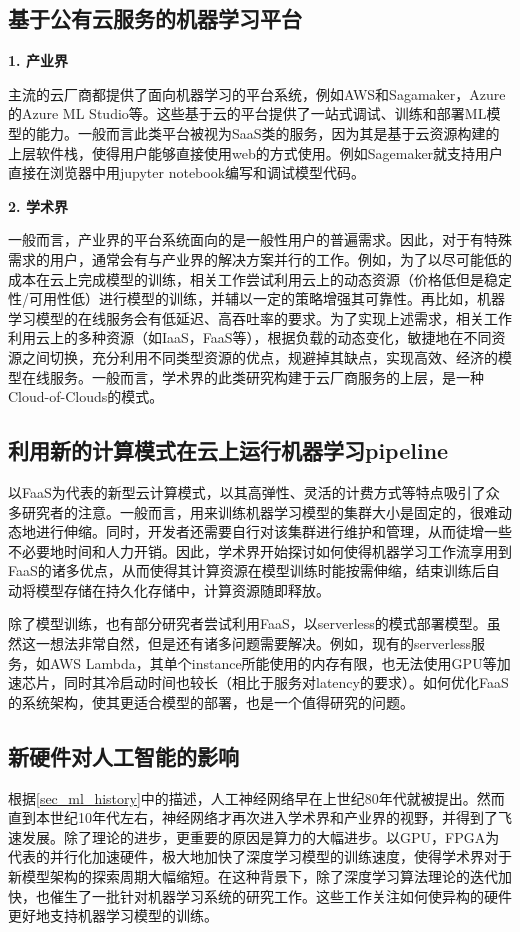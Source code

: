 \subsection{基于公有云服务的机器学习平台}
\textbf{1. 产业界}

主流的云厂商都提供了面向机器学习的平台系统，例如AWS和Sagamaker\parencite{joshi2020amazon,liberty2020elastic,perrone2020amazon}，Azure的Azure ML Studio\parencite{etaati2019azure}等。这些基于云的平台提供了一站式调试、训练和部署ML模型的能力。一般而言此类平台被视为SaaS类的服务，因为其是基于云资源构建的上层软件栈，使得用户能够直接使用web的方式使用。例如Sagemaker就支持用户直接在浏览器中用jupyter notebook编写和调试模型代码。

\textbf{2. 学术界}

一般而言，产业界的平台系统面向的是一般性用户的普遍需求。因此，对于有特殊需求的用户，通常会有与产业界的解决方案并行的工作。例如，为了以尽可能低的成本在云上完成模型的训练，相关工作\parencite{harlap2017proteus,li2020spottune}尝试利用云上的动态资源（价格低但是稳定性/可用性低）进行模型的训练，并辅以一定的策略增强其可靠性。再比如，机器学习模型的在线服务会有低延迟、高吞吐率的要求。为了实现上述需求，相关工作\parencite{zhang2019mark}利用云上的多种资源（如IaaS，FaaS等），根据负载的动态变化，敏捷地在不同资源之间切换，充分利用不同类型资源的优点，规避掉其缺点，实现高效、经济的模型在线服务。一般而言，学术界的此类研究构建于云厂商服务的上层，是一种Cloud-of-Clouds的模式。

\subsection{利用新的计算模式在云上运行机器学习pipeline}
以FaaS为代表的新型云计算模式，以其高弹性、灵活的计费方式等特点吸引了众多研究者的注意。一般而言，用来训练机器学习模型的集群大小是固定的，很难动态地进行伸缩。同时，开发者还需要自行对该集群进行维护和管理，从而徒增一些不必要地时间和人力开销。因此，学术界开始探讨如何使得机器学习工作流享用到FaaS的诸多优点\parencite{wang2019distributed}，从而使得其计算资源在模型训练时能按需伸缩，结束训练后自动将模型存储在持久化存储中，计算资源随即释放。

除了模型训练，也有部分研究者尝试利用FaaS，以serverless的模式部署模型。虽然这一想法非常自然，但是还有诸多问题需要解决。例如，现有的serverless服务，如AWS Lambda，其单个instance所能使用的内存有限，也无法使用GPU等加速芯片，同时其冷启动时间也较长（相比于服务对latency的要求）。如何优化FaaS的系统架构，使其更适合模型的部署，也是一个值得研究的问题。

\subsection{新硬件对人工智能的影响}
根据\ref{sec_ml_history}中的描述，人工神经网络早在上世纪80年代就被提出。然而直到本世纪10年代左右，神经网络才再次进入学术界和产业界的视野，并得到了飞速发展。除了理论的进步，更重要的原因是算力的大幅进步。以GPU，FPGA为代表的并行化加速硬件，极大地加快了深度学习模型的训练速度，使得学术界对于新模型架构的探索周期大幅缩短。在这种背景下，除了深度学习算法理论的迭代加快，也催生了一批针对机器学习系统的研究工作。这些工作关注如何使异构的硬件更好地支持机器学习模型的训练。


